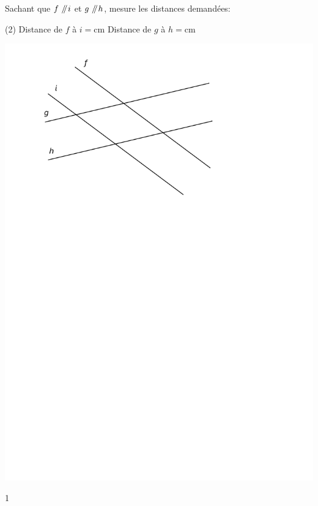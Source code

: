 \documentclass[a4paper,11pt]{report}
\begin{document}
\newpage
\begin{exop}
{Sachant que $f\mathbin{\;\!/\mkern-5mu/\!} i$ et $g\mathbin{\;\!/\mkern-5mu/\!} h$, mesure les distances demandées:
\begin{tasks}(2)
    \task Distance de $f$ à $i =$cm
     \task Distance de $g$ à $h =$cm
\end{tasks}
\begin{center}
\includegraphics[scale=0.8]{media/es-11/13-16}
\end{center}	
}
{1}
\end{exop}
\end{document}
